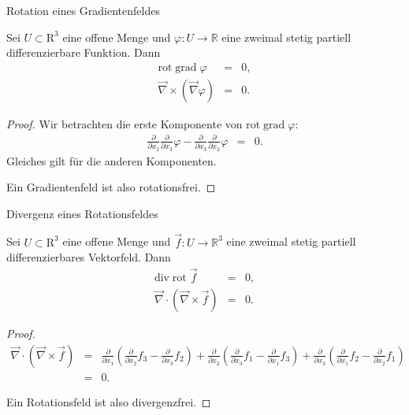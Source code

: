 \documentclass[german]{beamer}
\newcommand{\bq}{\begin{eqnarray*}}
\newcommand{\eq}{\end{eqnarray*}}
\begin{document}
\begin{frame}{Rotation eines Gradientenfeldes}

\begin{theorem}
Sei $U \subset {\mathrm R}^3$ eine offene Menge und 
$\varphi : U \rightarrow {\mathbb R}$ eine zweimal stetig partiell differenzierbare
Funktion. Dann
\bq
 \mbox{rot} \; \mbox{grad} \; \varphi & = & 0,
 \nonumber \\
 \vec{\nabla} \times \left( \vec{\nabla} \varphi \right) & = & 0.
\eq
\end{theorem}
\begin{proof}
Wir betrachten die erste Komponente von $\mbox{rot} \; \mbox{grad} \; \varphi$:
\bq
 \frac{\partial}{\partial x_2} \frac{\partial}{\partial x_3} \varphi 
 -
 \frac{\partial}{\partial x_3} \frac{\partial}{\partial x_2} \varphi 
 & = & 0.
\eq
Gleiches gilt f\"ur die anderen Komponenten. 

\vspace*{2mm}
Ein Gradientenfeld ist also rotationsfrei.
\end{proof}

\end{frame}

\begin{frame}{Divergenz eines Rotationsfeldes}

\begin{theorem}
Sei $U \subset {\mathrm R}^3$ eine offene Menge und 
$\vec{f} : U \rightarrow {\mathbb R}^3$ eine zweimal stetig partiell differenzierbares Vektorfeld.
Dann
\bq
 \mbox{div} \; \mbox{rot} \; \vec{f} & = & 0,
 \nonumber \\
 \vec{\nabla} \cdot \left( \vec{\nabla} \times \vec{f} \right) & = & 0.
\eq
\end{theorem}
\begin{proof}
{\scriptsize
\bq
 \vec{\nabla} \cdot \left( \vec{\nabla} \times \vec{f} \right) 
 & = &
 \frac{\partial}{\partial x_1} \left( \frac{\partial}{\partial x_2} f_3 - \frac{\partial}{\partial x_3} f_2 \right)
 +
 \frac{\partial}{\partial x_2} \left( \frac{\partial}{\partial x_3} f_1 - \frac{\partial}{\partial x_1} f_3 \right)
 +
 \frac{\partial}{\partial x_3} \left( \frac{\partial}{\partial x_1} f_2 - \frac{\partial}{\partial x_2} f_1 \right)
 \nonumber \\
 & = & 0.
\eq
}

\vspace*{2mm}
Ein Rotationsfeld ist also divergenzfrei.
\end{proof}

\end{frame}
\end{document}
